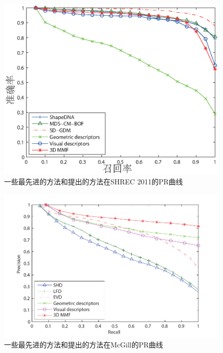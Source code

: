 \begin{figure}[tbhp]
\begin{center}
\includegraphics[width=1.0\linewidth]{figures/PR2011}
\end{center} 
\vspace{-4mm}
\caption{一些最先进的方法和提出的方法在SHREC 2011的PR曲线} \label{fig_rp_shrec2011}
\end{figure}

\begin{figure}[tbhp]
\begin{center}
\includegraphics[width=1.0\linewidth]{figures/Mcgill_PR}
\end{center} 
\vspace{-4mm}
\caption{一些最先进的方法和提出的方法在McGill的PR曲线} \label{fig_rp_McGill}
\end{figure}

